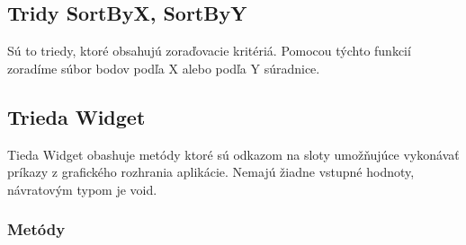 \documentclass[12pt]{article}
\begin{document}
\subsection{Tridy SortByX, SortByY}
Sú to triedy, ktoré obsahujú zoraďovacie kritériá. Pomocou týchto funkcií zoradíme súbor bodov podľa X alebo podľa Y súradnice.

\subsection{Trieda Widget}
Tieda Widget obashuje metódy ktoré sú odkazom na sloty umožňujúce vykonávať príkazy z grafického rozhrania aplikácie. Nemajú žiadne vstupné hodnoty, návratovým typom je void.

\subsubsection{Metódy}
\end{document}
